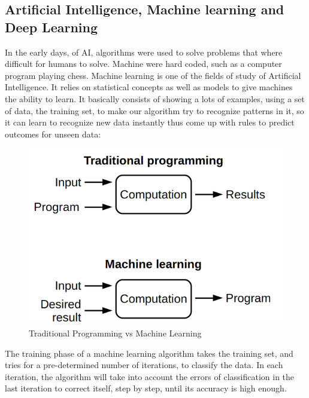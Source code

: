 \subsection{Artificial Intelligence, Machine learning and Deep Learning}
In the early days, of AI, algorithms were used to solve problems that where difficult for humans to solve. Machine were hard coded, such as a computer program playing chess.
\newline Machine learning is one of the fields of study of Artificial Intelligence. It relies on statistical concepts as well as models to give machines the ability to learn. It basically consists of showing a lots of examples, using a set of data, the training set, to make our algorithm try to recognize patterns in it, so it can learn to recognize new data instantly thus come up with rules to predict outcomes for unseen data:

\begin{figure}[!ht]
    \center
    \includegraphics[scale=0.3]{figures/marchine_learning_para.png}
    \caption{Traditional Programming vs Machine Learning}
\end{figure}


The training phase of a machine learning algorithm takes the training set, and tries for a pre-determined number of iterations, to classify the data. In each iteration, the algorithm will take into account the errors of classification in the last iteration to correct itself, step by step, until its accuracy is high enough.


